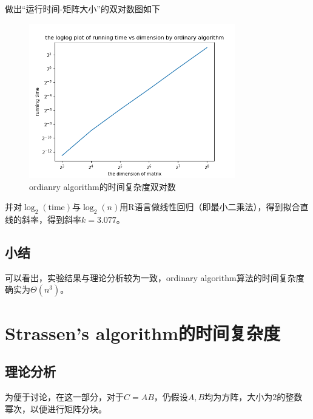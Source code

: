 \documentclass{article}
\begin{document}
\par 做出“运行时间-矩阵大小”的双对数图如下
	\begin{figure}[H]
			\centering  %
			\includegraphics[width=0.8\textwidth]{ord}
			\caption{ordianry algorithm的时间复杂度双对数}
		\end{figure}

\par 并对$\log_2(\text{time})$与$\log_2(n)$用R语言做线性回归（即最小二乘法），得到拟合直线的斜率，得到斜率$k=3.077$。

\subsection{小结} 可以看出，实验结果与理论分析较为一致，ordinary algorithm算法的时间复杂度确实为$\Theta(n^3)$。



\section{Strassen's algorithm的时间复杂度}
\subsection{理论分析}
为便于讨论，在这一部分，对于$C=AB$，仍假设$A,B$均为方阵，大小为2的整数幂次，以便进行矩阵分块。
\end{document}
